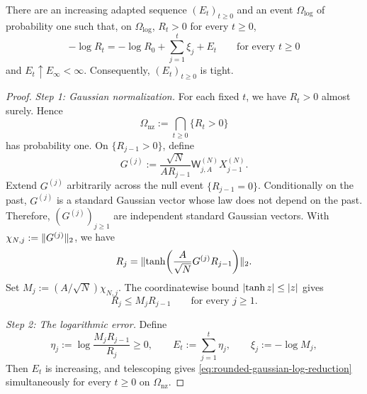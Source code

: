 \documentclass[11pt,reqno,a4paper]{article}
\begin{document}
\begin{lemma}
\label{lem:rounded-gaussian-log-reduction}
  There are an increasing adapted sequence $(E_t)_{t\geq0}$ and an event
  $\Omega_{\log}$ of probability one such that, on $\Omega_{\log}$,
  $R_t>0$ for every $t\geq0$,
  \begin{equation}\label{eq:rounded-gaussian-log-reduction}
    -\log R_t
    =
    -\log R_0
    +
    \sum_{j=1}^t\xi_j
    +
    E_t
    \qquad\mbox{for every }t\geq0
  \end{equation}
  and $E_t\uparrow E_\infty<\infty$. Consequently, $(E_t)_{t\geq0}$ is
  tight.
\end{lemma}

\begin{proof}
  \emph{Step 1: Gaussian normalization.}
  For each fixed $t$, we have $R_t>0$ almost surely. Hence
  \begin{equation*}
    \Omega_{\mathrm{nz}}
    :=
    \bigcap_{t\geq0}\{R_t>0\}
  \end{equation*}
  has probability one. On $\{R_{j-1}>0\}$, define
  \begin{equation*}
    G^{(j)}
    :=
    \frac{\sqrt N}{AR_{j-1}}
    \mathsf W_{j,A}^{(N)}X_{j-1}^{(N)}.
  \end{equation*}
  Extend $G^{(j)}$ arbitrarily across the null event
  $\{R_{j-1}=0\}$. Conditionally on the past, $G^{(j)}$ is a standard
  Gaussian vector whose law does not depend on the past. Therefore,
  $(G^{(j)})_{j\geq1}$ are independent standard Gaussian vectors. With
  $\chi_{N,j}:=\lVert G^{(j)}\rVert_2$, we have
  \begin{equation*}
    R_j
    =
    \norm{
      \tanh\left(\frac A{\sqrt N}G^{(j)}R_{j-1}\right)
    }_2.
  \end{equation*}
  Set $M_j:=(A/\sqrt N)\chi_{N,j}$. The coordinatewise bound
  $\abs{\tanh z}\leq\abs z$ gives
  \begin{equation}\label{eq:rounded-gaussian-linear-domination}
    R_j
    \leq
    M_jR_{j-1}
    \qquad\mbox{for every }j\geq1.
  \end{equation}

  \emph{Step 2: The logarithmic error.}
  Define
  \begin{equation*}
    \eta_j
    :=
    \log\frac{M_jR_{j-1}}{R_j}
    \geq0,
    \qquad
    E_t:=\sum_{j=1}^t\eta_j,
    \qquad
    \xi_j:=-\log M_j,
  \end{equation*}
  Then $E_t$ is increasing, and telescoping gives
  \cref{eq:rounded-gaussian-log-reduction} simultaneously for every $t\geq0$
  on $\Omega_{\mathrm{nz}}$.


\end{proof}
\end{document}
